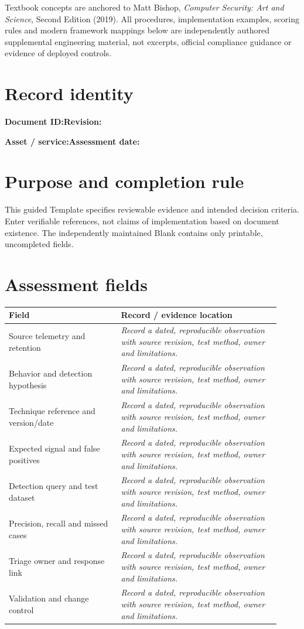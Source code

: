 \documentclass[10pt,letterpaper]{article}
\begin{document}
\makedoctocpage
\begin{notebox}
Textbook concepts are anchored to Matt Bishop, \emph{Computer Security: Art and Science}, Second Edition (2019). All procedures, implementation examples, scoring rules and modern framework mappings below are independently authored supplemental engineering material, not excerpts, official compliance guidance or evidence of deployed controls.
\end{notebox}
\section{Record identity}
\textbf{Document ID:}\enspace\hrulefill\quad\textbf{Revision:}\enspace\hrulefill
\par\medskip\textbf{Asset / service:}\enspace\hrulefill\quad\textbf{Assessment date:}\enspace\hrulefill
\section{Purpose and completion rule}
This guided Template specifies reviewable evidence and intended decision criteria. Enter verifiable references, not claims of implementation based on document existence. The independently maintained Blank contains only printable, uncompleted fields.
\section{Assessment fields}
\renewcommand{\arraystretch}{1.8}
\begin{longtable}{@{}p{0.38\linewidth}p{0.54\linewidth}@{}}
\toprule\textbf{Field}&\textbf{Record / evidence location}\\\midrule\endhead
Source telemetry and retention & \emph{Record a dated, reproducible observation with source revision, test method, owner and limitations.}\\\midrule
Behavior and detection hypothesis & \emph{Record a dated, reproducible observation with source revision, test method, owner and limitations.}\\\midrule
Technique reference and version/date & \emph{Record a dated, reproducible observation with source revision, test method, owner and limitations.}\\\midrule
Expected signal and false positives & \emph{Record a dated, reproducible observation with source revision, test method, owner and limitations.}\\\midrule
Detection query and test dataset & \emph{Record a dated, reproducible observation with source revision, test method, owner and limitations.}\\\midrule
Precision, recall and missed cases & \emph{Record a dated, reproducible observation with source revision, test method, owner and limitations.}\\\midrule
Triage owner and response link & \emph{Record a dated, reproducible observation with source revision, test method, owner and limitations.}\\\midrule
Validation and change control & \emph{Record a dated, reproducible observation with source revision, test method, owner and limitations.}\\\midrule
\bottomrule\end{longtable}
\end{document}

